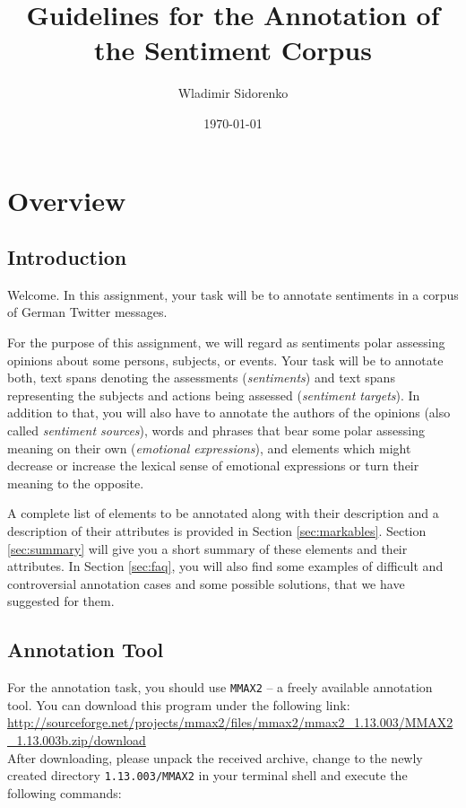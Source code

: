 \documentclass[11pt,a4paper]{article}
\author{Wladimir Sidorenko}
\date{\today}
\title{Guidelines for the Annotation of the Sentiment Corpus}
\begin{document}
\maketitle{}
\section{Overview}
\subsection{Introduction}

Welcome.  In this assignment, your task will be to annotate sentiments in a
corpus of German Twitter messages.

For the purpose of this assignment, we will regard as sentiments polar
assessing opinions about some persons, subjects, or events.  Your task will be
to annotate both, text spans denoting the assessments (\textit{sentiments})
and text spans representing the subjects and actions being assessed
(\textit{sentiment targets}). In addition to that, you will also have to
annotate the authors of the opinions (also called \textit{sentiment sources}),
words and phrases that bear some polar assessing meaning on their own
(\textit{emotional expressions}), and elements which might decrease or
increase the lexical sense of emotional expressions or turn their meaning to
the opposite.

A complete list of elements to be annotated along with their
description and a description of their attributes is provided in
Section \ref{sec:markables}.  Section \ref{sec:summary} will give you
a short summary of these elements and their attributes. In Section
\ref{sec:faq}, you will also find some examples of difficult and
controversial annotation cases and some possible solutions, that we
have suggested for them.

\subsection{Annotation Tool}

For the annotation task, you should use \texttt{MMAX2} -- a freely
available annotation tool.  You can download this program under the
following link:\\\newline
{\setlength{\parindent}{0pt}\small\url{http://sourceforge.net/projects/mmax2/files/mmax2/mmax2_1.13.003/MMAX2_1.13.003b.zip/download}}\\\newline
After downloading, please unpack the received archive, change to the
newly created directory \texttt{1.13.003/MMAX2} in your terminal shell
and execute the following commands:\\
\end{document}
